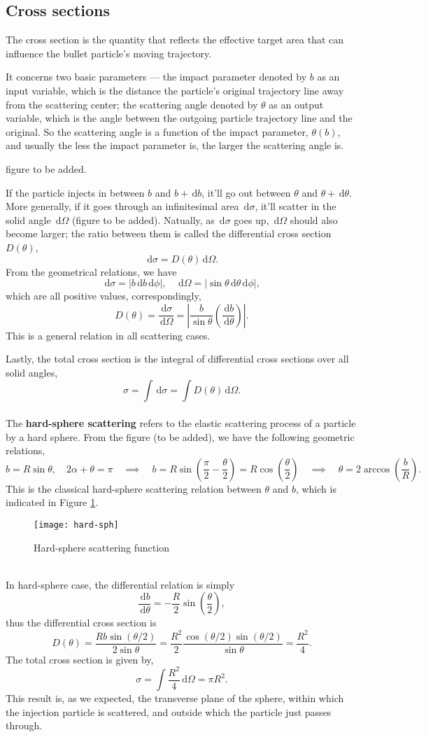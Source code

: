 \documentclass{article}
\newcommand{\be}{\begin{equation}}
\newcommand{\ee}{\end{equation}}
\newcommand{\dif}{\,\mathrm{d}}
\renewcommand{\1}{\left}
\renewcommand{\2}{\right}
\newcommand{\al}{\alpha}
\newcommand{\sig}{\sigma}
\renewcommand{\th}{\theta}
\begin{document}
\subsection{Cross sections}

The cross section is the quantity that reflects the effective target area that can influence the bullet particle's moving trajectory.

It concerns two basic parameters --- the impact parameter denoted by $b$ as an input variable, which is the distance the particle's original trajectory line away from the scattering center; the scattering angle denoted by $\th$ as an output variable, which is the angle between the outgoing particle trajectory line and the original. So the scattering angle is a function of the impact parameter, $\th(b)$, and usually the less the impact parameter is, the larger the scattering angle is.

figure to be added.

If the particle injects in between $b$ and $b+\dif b$, it'll go out between $\th$ and $\th+\dif\th$. More generally, if it goes through an infinitesimal area $\dif\sig$, it'll scatter in the solid angle $\dif\Omega$ (figure to be added). Natually, as $\dif\sig$ goes up, $\dif\Omega$ should also become larger; the ratio between them is called the differential cross section $D(\th)$,
\be
\dif\sig=D(\th)\dif\Omega.
\ee
From the geometrical relations, we have
\be
\dif\sig=|b\dif b\dif\phi|, \quad \dif\Omega=|\sin\th\dif\th\dif\phi|,
\ee
which are all positive values, correspondingly, 
\be
D(\th)=\frac{\dif\sig}{\dif\Omega}=\1| \frac b{\sin\th} \1(\frac{\dif b}{\dif\th}\2)\2|.
\ee
This is a general relation in all scattering cases.

Lastly, the total cross section is the integral of differential cross sections over all solid angles,
\be
\sig=\int\dif\sig=\int D(\th)\dif\Omega.
\ee\\

The \textbf{hard-sphere scattering} refers to the elastic scattering process of a particle by a hard sphere. From the figure (to be added), we have the following geometric relations,
\be
b=R\sin\th, \quad 2\al+\th=\pi \quad\implies\quad b=R\sin\1(\frac\pi 2 -\frac\th 2\2)=R\cos\1(\frac\th 2\2) \quad\implies\quad \th=2\arccos\1(\frac b R\2).
\ee
This is the classical hard-sphere scattering relation between $\th$ and $b$, which is indicated in Figure \ref{hard-sph}.
\begin{figure}[h]
\centering
\texttt{[image: hard-sph]}
\caption{Hard-sphere scattering function}
\label{hard-sph}
\end{figure}\\



In hard-sphere case, the differential relation is simply
\be
\frac{\dif b}{\dif\th}=-\frac R 2\sin{\1(\frac\th 2\2)},
\ee
thus the differential cross section is 
\be
D(\th)=\frac{Rb\sin{(\th/2)}}{2\sin\th}=\frac{R^2}2\frac{\cos(\th/2)\sin(\th/2)}{\sin\th}=\frac{R^2}4.
\ee
The total cross section is given by,
\be
\sig=\int\frac{R^2}4\dif\Omega=\pi R^2.
\ee
This result is, as we expected, the transverse plane of the sphere, within which the injection particle is scattered, and outside which the particle just passes through.
\end{document}
